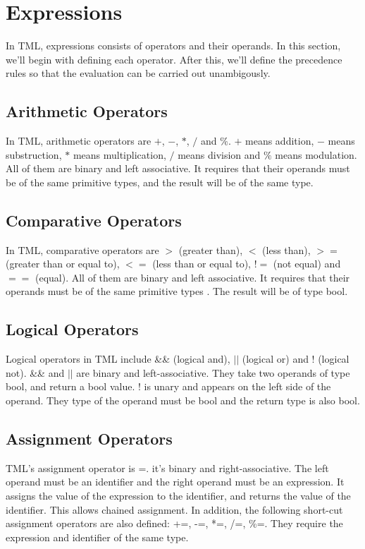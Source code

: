 \documentclass[12pt,psfig,a4]{article}
\begin{document}
\section{Expressions}
In TML, expressions consists of operators and their operands. In this section, we'll begin with defining each operator. After this, we'll define the precedence rules so that the evaluation can be carried out unambigously.

\subsection{Arithmetic Operators}
In TML, arithmetic operators are $+$, $-$, $*$, $/$ and $\%$. $+$ means addition, $-$ means substruction, $*$ means multiplication, $/$ means division and $\%$ means modulation. All of them are binary and left associative. It requires that their operands must be of the same primitive types, and the result will be of the same type.

\subsection{Comparative Operators}
In TML, comparative operators are $>$ (greater than), $<$ (less than), $>=$ (greater than or equal to), $<=$ (less than or equal to), $!=$ (not equal) and $==$ (equal). All of them are binary and left associative. It requires that their operands must be of the same primitive types . The result will be of type bool.

\subsection{Logical Operators}
Logical operators in TML include \&\& (logical and), $||$ (logical or) and ! (logical not). \&\& and $||$ are binary and left-associative. They take two operands of type bool, and return a bool value. ! is unary and appears on the left side of the operand. They type of the operand must be bool and the return type is also bool.

\subsection{Assignment Operators}
TML's assignment operator is =. it's binary and right-associative. The left operand must be an identifier and the right operand must be an expression. It assigns the value of the expression to the identifier, and returns the value of the identifier. This allows chained assignment. In addition, the following short-cut assignment operators are also defined: +=, -=, *=, /=, \%=. They require the expression and identifier of the same type.
\end{document}
